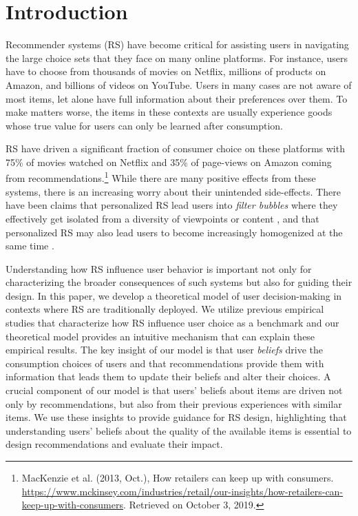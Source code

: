 \documentclass[sigconf]{acmart}
\begin{document}
\section{Introduction}

Recommender systems (RS) have become critical for assisting users in navigating the large choice sets that they face on many online platforms. For instance, users have to choose from thousands of movies on Netflix, millions of products on Amazon, and billions of videos on YouTube. Users in many cases are not aware of most items, let alone have full information about their preferences over them. To make matters worse, the items in these contexts are usually experience goods whose true value for users can only be learned after consumption.



RS have driven a significant fraction of consumer choice on these platforms with 75\% of movies watched on Netflix and 35\% of page-views on Amazon coming from recommendations.\footnote{MacKenzie et al. (2013, Oct.),  How retailers can keep up with consumers. \url{https://www.mckinsey.com/industries/retail/our-insights/how-retailers-can-keep-up-with-consumers}. Retrieved on October 3, 2019.} While there are many positive effects from these systems, there is an increasing worry about their unintended side-effects. There have been claims that personalized RS lead users into \textit{filter bubbles} where they effectively get isolated from a diversity of viewpoints or content \cite{pariser2011filter}, and that personalized RS may also lead users to become increasingly homogenized at the same time \cite{chaney2018algorithmic, hosanagar2013will}.


Understanding how RS influence user behavior is important not only for characterizing the broader consequences of such systems but also for guiding their design. In this paper, we develop a theoretical model of user decision-making in contexts where RS are traditionally deployed. We utilize previous empirical studies that characterize how RS influence user choice as a benchmark and our theoretical model provides an intuitive mechanism that can explain these empirical results. The key insight of our model is that user \textit{beliefs} drive the consumption choices of users and that recommendations provide them with information that leads them to update their beliefs and alter their choices. A crucial component of our model is that users' beliefs about items are driven not only by recommendations, but also from their previous experiences with similar items. We use these insights to provide guidance for RS design, highlighting that understanding users' beliefs about the quality of the available items is essential to design recommendations and evaluate their impact.
\end{document}
